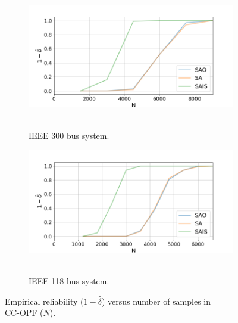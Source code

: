 \begin{figure}[hbt]
\centering
\begin{subfigure}{.8\textwidth}
  \centering
  \includegraphics[width=0.99\linewidth]{Dissertation/images/dc_stochastic_approx/case300/1_beta_N_12000_eta_001.png}~~~~~~\hfill
  \caption{IEEE 300 bus system.}
  \label{fig:ieee300reliability-dc}
\end{subfigure}

\begin{subfigure}{.8\textwidth}
  \centering
  \includegraphics[width=0.99\linewidth]{Dissertation/images/dc_stochastic_approx/ieee118/1_beta_N_7800_eta_001.png}~~~~~~\hfill
  \caption{IEEE 118 bus system.}
  \label{fig:ieee118reliability-dc}
\end{subfigure}
\caption{Empirical reliability ($1-\hat{\delta}$) versus number of samples in \\CC-OPF ($N$).}
\label{fig:empiricals-dc}
\end{figure}

